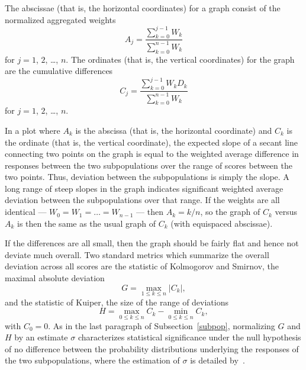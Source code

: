 \documentclass{article}
\begin{document}
The abscissae (that is, the horizontal coordinates)
for a graph consist of the normalized aggregated weights
%
\begin{equation}
\label{abscissae}
A_j = \frac{\sum_{k=0}^{j-1} W_k}{\sum_{k=0}^{n-1} W_k}
\end{equation}
%
for $j = 1$, $2$, \dots, $n$.
The ordinates (that is, the vertical coordinates)
for the graph are the cumulative differences
%
\begin{equation}
\label{cumulativew}
C_j = \frac{\sum_{k=0}^{j-1} W_k D_k}{\sum_{k=0}^{n-1} W_k}
\end{equation}
%
for $j = 1$, $2$, \dots, $n$.

In a plot where $A_k$ is the abscissa (that is, the horizontal coordinate)
and $C_k$ is the ordinate (that is, the vertical coordinate),
the expected slope of a secant line connecting two points on the graph is equal
to the weighted average difference in responses
between the two subpopulations over the range of scores between the two points.
Thus, deviation between the subpopulations is simply the slope.
A long range of steep slopes in the graph indicates significant
weighted average deviation between the subpopulations over that range.
If the weights are all identical ---
$W_0 = W_1 = \dots = W_{n-1}$ --- then $A_k = k/n$, so the graph
of $C_k$ versus $A_k$ is then the same as the usual graph
of $C_k$ (with equispaced abscissae).

If the differences are all small, then the graph should be fairly flat
and hence not deviate much overall.
Two standard metrics which summarize the overall deviation across all scores
are the statistic of Kolmogorov and Smirnov, the maximal absolute deviation
%
\begin{equation}
\label{Kolmogorov-Smirnov2}
G = \max_{1 \le k \le n} |C_k|,
\end{equation}
%
and the statistic of Kuiper, the size of the range of deviations
%
\begin{equation}
\label{Kuiper2}
H = \max_{0 \le k \le n} C_k - \min_{0 \le k \le n} C_k,
\end{equation}
%
with $C_0 = 0$.
As in the last paragraph of Subsection~\ref{subpop},
normalizing $G$ and $H$ by an estimate $\sigma$ characterizes
statistical significance under the null hypothesis
of no difference between the probability distributions
underlying the responses of the two subpopulations,
where the estimation of $\sigma$ is detailed by~\cite{tygert_two}.
\end{document}
